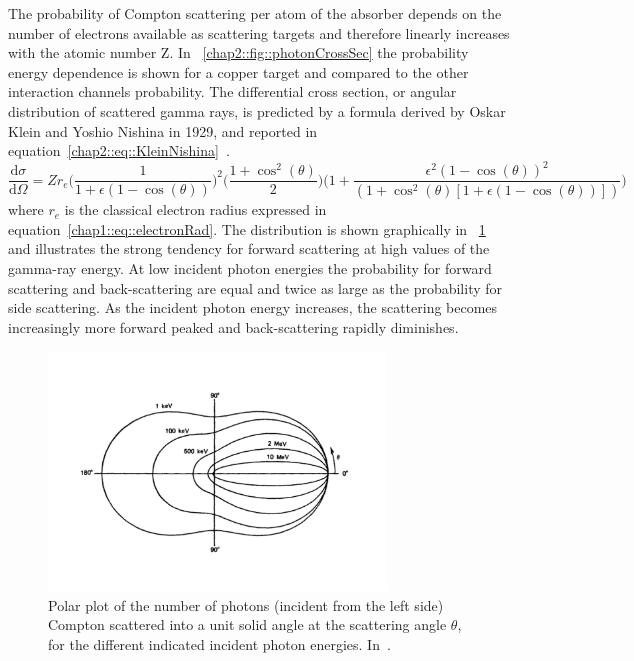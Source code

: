 The probability of Compton scattering per atom of the absorber depends on the number of electrons available as scattering targets and therefore linearly increases with the atomic number Z. In \figurename~\ref{chap2::fig::photonCrossSec} the probability energy dependence is shown for a copper target and compared to the other interaction channels probability. The differential cross section, or angular distribution of scattered gamma rays, is predicted by a formula derived by Oskar Klein and Yoshio Nishina in 1929, and reported in equation~\ref{chap2::eq::KleinNishina}~\parencite{Klein1929}.
 \begin{equation}
\frac{\mathrm{d}\sigma}{\mathrm{d}\Omega} = Zr_{e}\bigg(\frac{1}{1+\epsilon (1-\cos(\theta))}\bigg)^{2}\bigg( \frac{1+\cos^2(\theta)}{2} \bigg)\bigg(1+\frac{\epsilon^2(1-\cos(\theta))^2}{(1+\cos^2(\theta)[1+\epsilon(1-\cos(\theta))])} \bigg) 
\label{chap2::eq::KleinNishina}
\end{equation} 
where $r_{e}$ is the classical electron radius expressed in equation~\ref{chap1::eq::electronRad}. The distribution is shown graphically in \figurename~\ref{chap2::fig::ComptonAngCrossSection} and illustrates the strong tendency for forward scattering at high values of the gamma-ray energy. At low incident photon energies the probability for forward scattering and back-scattering are equal and twice as large as the probability for side scattering. As the incident photon energy increases, the scattering becomes increasingly more forward peaked and back-scattering rapidly diminishes.

\begin{figure}[!htbp]
\centering
\includegraphics[width=0.8\textwidth]{03_GraphicFiles/chapter2_GammaCameras/ComptonPolar.pdf}
\caption{Polar plot of the number of photons (incident from the left side) Compton scattered into a unit solid angle at the scattering angle $\theta$, for the different indicated incident photon energies. In~\cite{Knoll2000}.}
\label{chap2::fig::ComptonAngCrossSection}
\end{figure}
 
